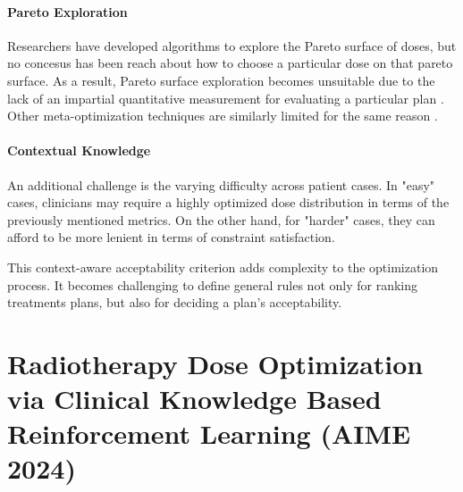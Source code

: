 \paragraph{Pareto Exploration}
Researchers have developed algorithms to explore the Pareto surface of doses, but no concesus has been reach about how to choose a particular dose on that pareto surface.
As a result, Pareto surface exploration becomes unsuitable due to the lack of an impartial quantitative measurement for evaluating a particular plan \cite{huang_pareto_2021}.
Other meta-optimization techniques are similarly limited for the same reason \cite{wu_optimization_2001, xing_optimization_1999}.

\paragraph{Contextual Knowledge}
An additional challenge is the varying difficulty across patient cases.
In "easy" cases, clinicians may require a highly optimized dose distribution in terms of the previously mentioned metrics.
On the other hand, for "harder" cases, they can afford to be more lenient in terms of constraint satisfaction.

This context-aware acceptability criterion adds complexity to the optimization process.
It becomes challenging to define general rules not only for ranking treatments plans, but also for deciding a plan's acceptability.


\section{Radiotherapy Dose Optimization via Clinical Knowledge Based Reinforcement Learning (AIME 2024)}


